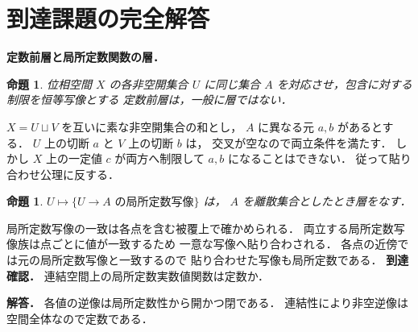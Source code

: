 \documentclass[a5paper,10pt,onecolumn]{jsarticle}
\makeatletter
\theoremstyle{mathnotetheorem}
\newtheorem{proposition}[theorem]{命題}
\renewcommand{\proofname}{証明}
\renewenvironment{proof}[1][\proofname]{%
  \par\pushQED{\qed}\normalfont\topsep4\p@\@plus2\p@\relax
  \trivlist\item[\hskip\labelsep\bfseries #1]\ignorespaces
}{\popQED\endtrivlist\@endpefalse}
\makeatother
\begin{document}
\section{到達課題の完全解答}
\noindent\textbf{定数前層と局所定数関数の層．}
\begin{proposition}
位相空間 $X$ の各非空開集合 $U$ に同じ集合
$A$ を対応させ，包含に対する制限を恒等写像とする
定数前層は，一般に層ではない．
\end{proposition}
\begin{proof}
$X=U\sqcup V$ を互いに素な非空開集合の和とし，
$A$ に異なる元 $a,b$ があるとする．
$U$ 上の切断 $a$ と $V$ 上の切断 $b$ は，
交叉が空なので両立条件を満たす．
しかし $X$ 上の一定値 $c$ が両方へ制限して
$a,b$ になることはできない．
従って貼り合わせ公理に反する．
\end{proof}
\begin{proposition}
$U\mapsto\{U\to A\text{ の局所定数写像}\}$ は，
$A$ を離散集合としたとき層をなす．
\end{proposition}
\begin{proof}
局所定数写像の一致は各点を含む被覆上で確かめられる．
両立する局所定数写像族は点ごとに値が一致するため
一意な写像へ貼り合わされる．
各点の近傍では元の局所定数写像と一致するので
貼り合わせた写像も局所定数である．
\end{proof}
\noindent\textbf{到達確認．}
連結空間上の局所定数実数値関数は定数か．
\par\noindent\textbf{解答．}
各値の逆像は局所定数性から開かつ閉である．
連結性により非空逆像は空間全体なので定数である．
\end{document}
